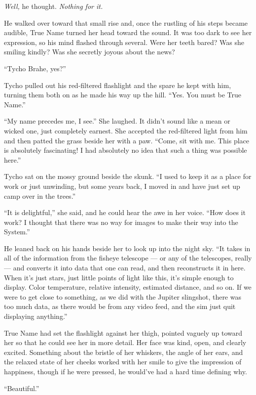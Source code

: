 \emph{Well,} he thought. \emph{Nothing for it.}

He walked over toward that small rise and, once the rustling of his steps became audible, True Name turned her head toward the sound. It was too dark to see her expression, so his mind flashed through several. Were her teeth bared? Was she smiling kindly? Was she secretly joyous about the news?

``Tycho Brahe, yes?''

Tycho pulled out his red-filtered flashlight and the spare he kept with him, turning them both on as he made his way up the hill. ``Yes. You must be True Name.''

``My name precedes me, I see.'' She laughed. It didn't sound like a mean or wicked one, just completely earnest. She accepted the red-filtered light from him and then patted the grass beside her with a paw. ``Come, sit with me. This place is absolutely fascinating! I had absolutely no idea that such a thing was possible here.''

Tycho sat on the mossy ground beside the skunk. ``I used to keep it as a place for work or just unwinding, but some years back, I moved in and have just set up camp over in the trees.''

``It is delightful,'' she said, and he could hear the awe in her voice. ``How does it work? I thought that there was no way for images to make their way into the System.''

He leaned back on his hands beside her to look up into the night sky. ``It takes in all of the information from the fisheye telescope — or any of the telescopes, really — and converts it into data that one can read, and then reconstructs it in here. When it's just stars, just little points of light like this, it's simple enough to display. Color temperature, relative intensity, estimated distance, and so on. If we were to get close to something, as we did with the Jupiter slingshot, there was too much data, as there would be from any video feed, and the sim just quit displaying anything.''

True Name had set the flashlight against her thigh, pointed vaguely up toward her so that he could see her in more detail. Her face was kind, open, and clearly excited. Something about the bristle of her whiskers, the angle of her ears, and the relaxed state of her cheeks worked with her smile to give the impression of happiness, though if he were pressed, he would've had a hard time defining why.

``Beautiful.''

